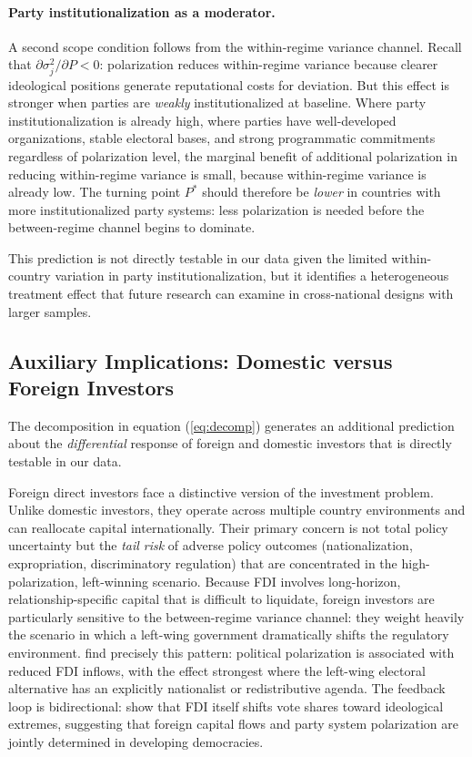 \documentclass[12pt]{article}
\begin{document}
\paragraph{Party institutionalization as a moderator.} A second scope
condition follows from the within-regime variance channel. Recall that
$\partial \sigma_j^2 / \partial P < 0$: polarization reduces within-regime
variance because clearer ideological positions generate reputational costs
for deviation. But this effect is stronger when parties are \textit{weakly}
institutionalized at baseline. Where party institutionalization is already
high, where parties have well-developed organizations, stable electoral
bases, and strong programmatic commitments regardless of polarization level,
the marginal benefit of additional polarization in reducing within-regime
variance is small, because within-regime variance is already low. The
turning point $P^*$ should therefore be \textit{lower} in countries with
more institutionalized party systems: less polarization is needed before
the between-regime channel begins to dominate.

This prediction is not directly testable in our data given the limited
within-country variation in party institutionalization, but it identifies
a heterogeneous treatment effect that future research can examine in
cross-national designs with larger samples.

\subsection{Auxiliary Implications: Domestic versus Foreign Investors}

The decomposition in equation (\ref{eq:decomp}) generates an additional
prediction about the \textit{differential} response of foreign and domestic
investors that is directly testable in our data.

Foreign direct investors face a distinctive version of the investment problem.
Unlike domestic investors, they operate across multiple country environments
and can reallocate capital internationally. Their primary concern is not
total policy uncertainty but the \textit{tail risk} of adverse policy
outcomes (nationalization, expropriation, discriminatory regulation)
that are concentrated in the high-polarization, left-winning scenario.
Because FDI involves long-horizon, relationship-specific capital that is
difficult to liquidate, foreign investors are particularly sensitive to the
between-regime variance channel: they weight heavily the scenario in which a
left-wing government dramatically shifts the regulatory environment.
\citet{KokashviliBarbakadze2020} find precisely this pattern: political
polarization is associated with reduced FDI inflows, with the effect
strongest where the left-wing electoral alternative has an explicitly
nationalist or redistributive agenda. The feedback loop is bidirectional:
\citet{CohleOrtega2022} show that FDI itself shifts vote shares toward
ideological extremes, suggesting that foreign capital flows and party
system polarization are jointly determined in developing democracies.
\end{document}
